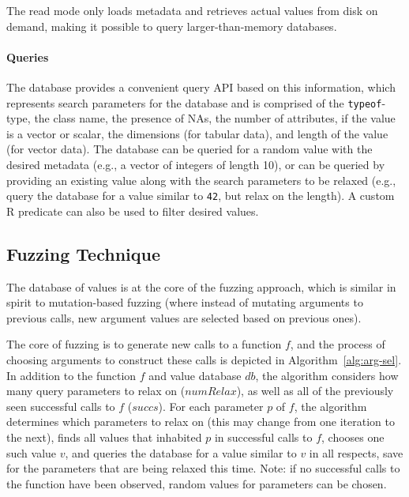 \documentclass[sigplan,anonymous,review]{acmart}
\begin{document}
The read mode only loads metadata and retrieves actual values from disk on demand, making it possible to query larger-than-memory databases.

\paragraph{Queries}

The database provides a convenient query API based on this information, which represents search parameters for the database and is comprised of the {\tt typeof}-type, the class name, the presence of NAs, the number of attributes, if the value is a vector or scalar, the dimensions (for tabular data), and length of the value (for vector data).
The database can be queried for a random value with the desired metadata (e.g., a vector of integers of length 10), or can be queried by providing an existing value along with the search parameters to be relaxed (e.g., query the database for a value similar to {\tt 42}, but relax on the length). A custom R predicate can also be used to filter desired values.


\subsection{Fuzzing Technique}

The database of values is at the core of the fuzzing approach, which is similar in spirit to mutation-based fuzzing (where instead of mutating arguments to previous calls, new argument values are selected based on previous ones).

The core of fuzzing is to generate new calls to a function $f$, and the process of choosing arguments to construct these calls is depicted in Algorithm~\ref{alg:arg-sel}.
In addition to the function $f$ and value database $db$, the algorithm considers how many query parameters to relax on ($numRelax$), as well as all of the previously seen successful calls to $f$ ($succs$).
For each parameter $p$ of $f$, the algorithm determines which parameters to relax on (this may change from one iteration to the next), finds all values that inhabited $p$ in successful calls to $f$, chooses one such value $v$, and queries the database for a value similar to $v$ in all respects, save for the parameters that are being relaxed this time.
Note: if no successful calls to the function have been observed, random values for parameters can be chosen.
\end{document}

